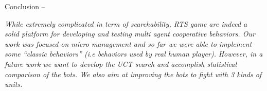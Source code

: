 \begin{bfseries} Conclusion -- \end{bfseries}
    \emph{While extremely complicated in term of searchability, RTS game are indeed a solid platform for developing and testing multi agent cooperative behaviors. Our work was focused on micro management and so far we were able to implement some ``classic behaviors'' (\emph{i.e} behaviors used by real human player).} 
    \emph{However, in a future work we want to develop the UCT search and accomplish statistical comparison of the bots. We also aim at improving the bots to fight with 3 kinds of units.} 

